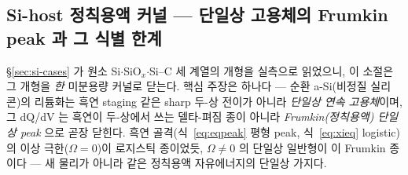 \subsection{Si-host 정칙용액 커널 --- 단일상 고용체의 Frumkin peak 과 그 식별 한계}\label{ssec:si-fr}
\S\ref{sec:si-cases} 가 원소 Si$\cdot$SiO$_x$$\cdot$Si--C 세 계열의 개형을 실측으로 읽었으니, 이 소절은 그
개형을 \emph{한} 미분용량 커널로 닫는다. 핵심 주장은 하나다 --- 순환 a-Si(비정질 실리콘)의 리튬화는 흑연 staging 같은
sharp 두-상 전이가 아니라 \emph{단일상 연속 고용체}이며, 그 dQ/dV 는 흑연이 두-상에서 쓰는 델타-펴짐 종이 아니라
\emph{Frumkin(정칙용액) 단일상 peak} 으로 곧장 닫힌다. 흑연 골격(식~\eqref{eq:eqpeak} 평형 peak,
식~\eqref{eq:xieq} logistic)의 이상 극한($\Omega{=}0$)이 로지스틱 종이었듯, $\Omega\ne0$ 의 단일상 일반형이
이 Frumkin 종이다 --- 새 물리가 아니라 같은 정칙용액 자유에너지의 단일상 가지다.

